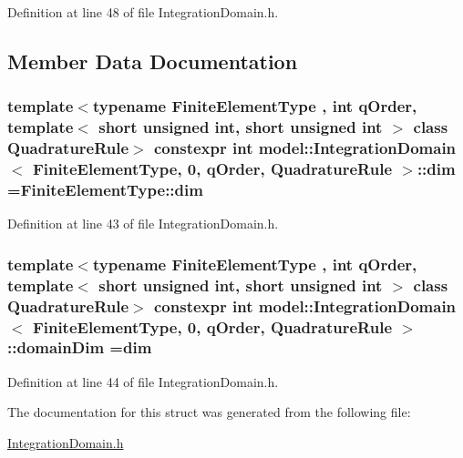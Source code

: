Definition at line 48 of file Integration\+Domain.\+h.



\subsection{Member Data Documentation}
\hypertarget{structmodel_1_1_integration_domain_3_01_finite_element_type_00_010_00_01q_order_00_01_quadrature_rule_01_4_a212a4ee1508141a0fd040c7ba09c8ca7}{}
\subsubsection[{dim}]{\setlength{\rightskip}{0pt plus 5cm}template$<$typename Finite\+Element\+Type , int q\+Order, template$<$ short unsigned int, short unsigned int $>$ class Quadrature\+Rule$>$ constexpr int {\bf model\+::\+Integration\+Domain}$<$ Finite\+Element\+Type, 0, q\+Order, Quadrature\+Rule $>$\+::dim =Finite\+Element\+Type\+::dim\hspace{0.3cm}{\ttfamily [static]}}\label{structmodel_1_1_integration_domain_3_01_finite_element_type_00_010_00_01q_order_00_01_quadrature_rule_01_4_a212a4ee1508141a0fd040c7ba09c8ca7}


Definition at line 43 of file Integration\+Domain.\+h.

\hypertarget{structmodel_1_1_integration_domain_3_01_finite_element_type_00_010_00_01q_order_00_01_quadrature_rule_01_4_a6e663723cfa6cd7cff426573312390b3}{}
\subsubsection[{domain\+Dim}]{\setlength{\rightskip}{0pt plus 5cm}template$<$typename Finite\+Element\+Type , int q\+Order, template$<$ short unsigned int, short unsigned int $>$ class Quadrature\+Rule$>$ constexpr int {\bf model\+::\+Integration\+Domain}$<$ Finite\+Element\+Type, 0, q\+Order, Quadrature\+Rule $>$\+::domain\+Dim ={\bf dim}\hspace{0.3cm}{\ttfamily [static]}}\label{structmodel_1_1_integration_domain_3_01_finite_element_type_00_010_00_01q_order_00_01_quadrature_rule_01_4_a6e663723cfa6cd7cff426573312390b3}


Definition at line 44 of file Integration\+Domain.\+h.



The documentation for this struct was generated from the following file\+:\begin{DoxyCompactItemize}
\item 
\hyperlink{_integration_domain_8h}{Integration\+Domain.\+h}\end{DoxyCompactItemize}
